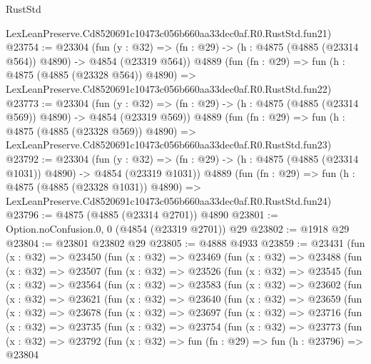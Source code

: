 \begin{lexlean}{RustStd}
\begin{coremodule}
    LexLeanPreserve.Cd8520691c10473c056b660aa33dec0af.R0.RustStd.fun21)
@23754 := @23304
    (fun (y : @32) => (fn : @29) -> (h : @4875 (@4885 (@23314 @564)) @4890) -> @4854 (@23319 @564))
    @4889
    (fun (fn : @29) =>
    fun (h : @4875 (@4885 (@23328 @564)) @4890) =>
    LexLeanPreserve.Cd8520691c10473c056b660aa33dec0af.R0.RustStd.fun22)
@23773 := @23304
    (fun (y : @32) => (fn : @29) -> (h : @4875 (@4885 (@23314 @569)) @4890) -> @4854 (@23319 @569))
    @4889
    (fun (fn : @29) =>
    fun (h : @4875 (@4885 (@23328 @569)) @4890) =>
    LexLeanPreserve.Cd8520691c10473c056b660aa33dec0af.R0.RustStd.fun23)
@23792 := @23304
    (fun (y : @32) =>
    (fn : @29) -> (h : @4875 (@4885 (@23314 @1031)) @4890) -> @4854 (@23319 @1031))
    @4889
    (fun (fn : @29) =>
    fun (h : @4875 (@4885 (@23328 @1031)) @4890) =>
    LexLeanPreserve.Cd8520691c10473c056b660aa33dec0af.R0.RustStd.fun24)
@23796 := @4875 (@4885 (@23314 @2701)) @4890
@23801 := Option.noConfusion.{0, 0} (@4854 (@23319 @2701)) @29
@23802 := @1918 @29
@23804 := @23801 @23802 @29
@23805 := @4888 @4933
@23859 := @23431
    (fun (x : @32) =>
    @23450
      (fun (x : @32) =>
      @23469
        (fun (x : @32) =>
        @23488
          (fun (x : @32) =>
          @23507
            (fun (x : @32) =>
            @23526
              (fun (x : @32) =>
              @23545
                (fun (x : @32) =>
                @23564
                  (fun (x : @32) =>
                  @23583
                    (fun (x : @32) =>
                    @23602
                      (fun (x : @32) =>
                      @23621
                        (fun (x : @32) =>
                        @23640
                          (fun (x : @32) =>
                          @23659
                            (fun (x : @32) =>
                            @23678
                              (fun (x : @32) =>
                              @23697
                                (fun (x : @32) =>
                                @23716
                                  (fun (x : @32) =>
                                  @23735
                                    (fun (x : @32) =>
                                    @23754
                                      (fun (x : @32) =>
                                      @23773
                                        (fun (x : @32) =>
                                        @23792
                                          (fun (x : @32) =>
                                          fun (fn : @29) =>
                                          fun (h : @23796) =>
                                          @23804

\end{coremodule}
\end{lexlean}
